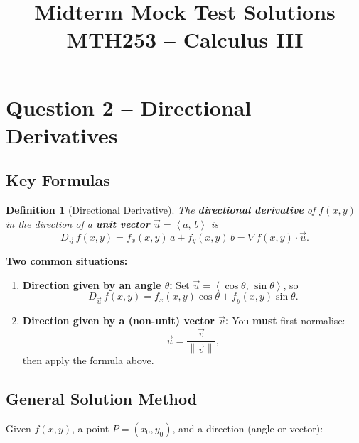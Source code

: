 \documentclass[12pt]{article}
\title{\textbf{Midterm Mock Test Solutions} \\ \large MTH253 -- Calculus III}
\author{}
\date{}
\newtheorem{definition}{Definition}
\newcommand{\vect}[1]{\vec{#1}}
\newcommand{\grad}{\nabla}
\newcommand{\norm}[1]{\left\| #1 \right\|}
\newcommand{\inner}[2]{\left\langle #1,\, #2 \right\rangle}
\begin{document}
\maketitle

\section{Question 2 -- Directional Derivatives}

\subsection{Key Formulas}

\begin{definition}[Directional Derivative]
The \textbf{directional derivative} of $f(x,y)$ in the direction of a
\textbf{unit vector} $\vect{u} = \inner{a}{b}$ is
\[
  D_{\vect{u}}\, f(x,y)
    = f_x(x,y)\,a + f_y(x,y)\,b
    = \grad f(x,y) \cdot \vect{u}.
\]
\end{definition}

\medskip

\noindent\textbf{Two common situations:}

\begin{enumerate}[label=(\roman*)]
  \item \textbf{Direction given by an angle $\theta$:}
        Set $\vect{u} = \inner{\cos\theta}{\sin\theta}$, so
        \[
          D_{\vect{u}}\, f(x,y)
            = f_x(x,y)\cos\theta + f_y(x,y)\sin\theta.
        \]

  \item \textbf{Direction given by a (non-unit) vector $\vect{v}$:}
        You \textbf{must} first normalise:
        \[
          \vect{u} = \frac{\vect{v}}{\norm{\vect{v}}},
        \]
        then apply the formula above.
\end{enumerate}

\subsection{General Solution Method}

Given $f(x,y)$, a point $P=(x_0,y_0)$, and a direction (angle or vector):
\end{document}
